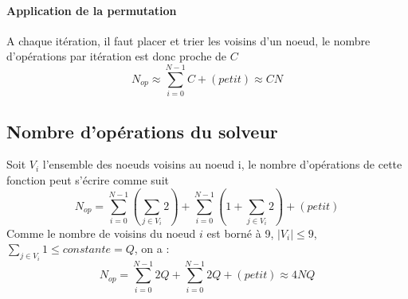\documentclass[11pt]{article}
\begin{document}
\paragraph{Application de la permutation} A chaque itération, il faut placer et trier les voisins d'un noeud, le nombre d'opérations par itération est donc proche de $C$
\begin{equation}
    N_{op} \approx \sum_{i = 0}^{N-1} C + (petit) \approx C N
\end{equation}
\vspace{-20pt}

\subsection*{Nombre d'opérations du solveur}
Soit $V_i$ l'ensemble des noeuds voisins au noeud i, le nombre d'opérations de cette fonction peut s'écrire comme suit
\begin{equation}
    N_{op} = \sum_{i = 0}^{N-1}\left( \sum_{j \in V_i} 2 \right) + \sum_{i = 0}^{N-1}\left( 1 + \sum_{j \in V_i} 2 \right) + (petit)
\end{equation}
Comme le nombre de voisins du noeud $i$ est borné à 9, $|V_i| \leq 9$, $\sum_{j \in V_i} 1 \leq constante = Q$, on a :
\begin{equation}
    N_{op} = \sum_{i = 0}^{N-1}2Q + \sum_{i = 0}^{N-1}2Q + (petit) \approx 4NQ
\end{equation}
\end{document}
